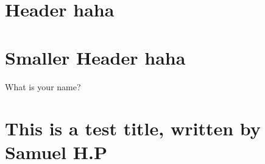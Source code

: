 \documentclass{article}
\begin{document}
\section*{\huge{Header haha}}
\normalsize{}

\section*{\LARGE{Smaller Header haha}}
\normalsize{}


What is your name?

\section*{\huge{This is a test title, written by Samuel H.P}}
\normalsize{}
\end{document}
